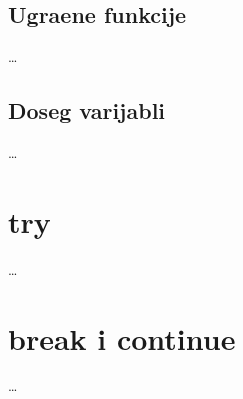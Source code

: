 \subsection{Ugra\dj{}ene funkcije}

\dots

\subsection{Doseg varijabli}

\dots

\section{try}

\dots

\section{break i continue}

\dots

